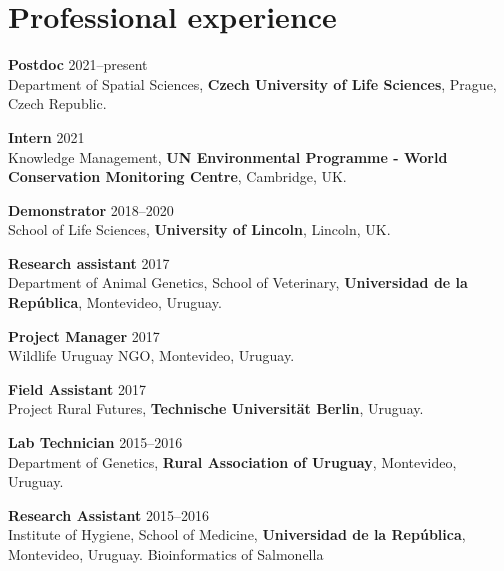 \HRule

\section{Professional experience}

\begin{innerlist}

\item[]{\bf Postdoc}
\hfill {2021--present} \\
Department of Spatial Sciences, {\bf Czech University of Life Sciences}, Prague, Czech Republic.\\

\item[]{\bf Intern}
\hfill {2021} \\
Knowledge Management, {\bf UN Environmental Programme - World Conservation Monitoring Centre}, Cambridge, UK.\\

\item[]{\bf Demonstrator}
\hfill {2018--2020} \\
School of Life Sciences, {\bf University of Lincoln}, Lincoln, UK.\\

\item[]{\bf Research assistant}
\hfill {2017} \\
Department of Animal Genetics, School of Veterinary, {\bf Universidad de la Rep\'{u}blica}, Montevideo, Uruguay.\\

\item[]{\bf Project Manager}
\hfill {2017} \\
Wildlife Uruguay NGO, Montevideo, Uruguay.\\

\item[]{\bf Field Assistant}
\hfill {2017} \\
Project Rural Futures, {\bf Technische Universität Berlin}, Uruguay.\\

\item[]{\bf Lab Technician}
\hfill {2015--2016}\\
Department of Genetics, {\bf Rural Association of Uruguay}, Montevideo, Uruguay.\\

\item[]{\bf Research Assistant}
\hfill {2015--2016}\\
Institute of Hygiene, School of Medicine, {\bf Universidad de la Rep\'{u}blica}, Montevideo, Uruguay. Bioinformatics of Salmonella\\


\end{innerlist}
